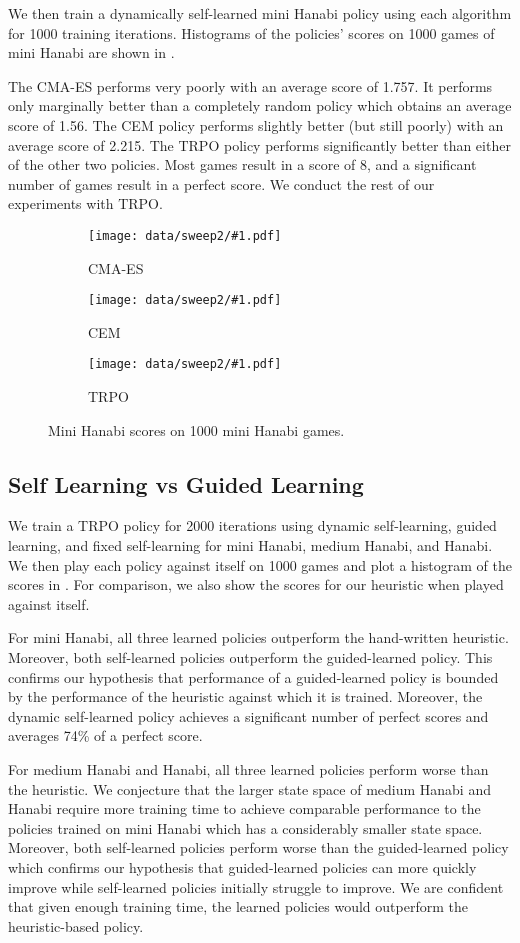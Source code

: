 We then train a dynamically self-learned mini Hanabi policy using each
algorithm for 1000 training iterations. Histograms of the policies' scores on
1000 games of mini Hanabi are shown in .

The CMA-ES performs very poorly with an average score of 1.757.  It performs
only marginally better than a completely random policy which obtains an average
score of 1.56.
%
The CEM policy performs slightly better (but still poorly) with an average
score of 2.215.
%
The TRPO policy performs significantly better than either of the other two
policies. Most games result in a score of 8, and a significant number of games
result in a perfect score.
%
We conduct the rest of our experiments with TRPO.

\begin{figure}[ht]
  \newcommand{\algosubfig}[3]{%
    \begin{subfigure}[b]{0.32\textwidth}
      \centering
      \texttt{[image: data/sweep2/\#1.pdf]}
      \caption{#2}\label{fig:#3}
    \end{subfigure}
  }

  \centering
  \algosubfig{CMA-ES}{CMA-ES}{cmaes}
  \algosubfig{CEM}{CEM}{cem}
  \algosubfig{TRPO}{TRPO}{trpo}
  \caption{Mini Hanabi scores on 1000 mini Hanabi games.}\label{fig:algos}
\end{figure}

\subsection{Self Learning vs Guided Learning}
We train a TRPO policy for 2000 iterations using dynamic self-learning, guided
learning, and fixed self-learning for mini Hanabi, medium Hanabi, and Hanabi.
We then play each policy against itself on 1000 games and plot a histogram of
the scores in . For comparison, we also show the scores for our
heuristic when played against itself.

For mini Hanabi, all three learned policies outperform the hand-written
heuristic. Moreover, both self-learned policies outperform the guided-learned
policy. This confirms our hypothesis that performance of a guided-learned
policy is bounded by the performance of the heuristic against which it is
trained.  Moreover, the dynamic self-learned policy achieves a significant
number of perfect scores and averages 74\% of a perfect score.

For medium Hanabi and Hanabi, all three learned policies perform worse than the
heuristic. We conjecture that the larger state space of medium Hanabi and
Hanabi require more training time to achieve comparable performance to the
policies trained on mini Hanabi which has a considerably smaller state space.
Moreover, both self-learned policies perform worse than the guided-learned
policy which confirms our hypothesis that guided-learned policies can more
quickly improve while self-learned policies initially struggle to improve. We
are confident that given enough training time, the learned policies would
outperform the heuristic-based policy.


